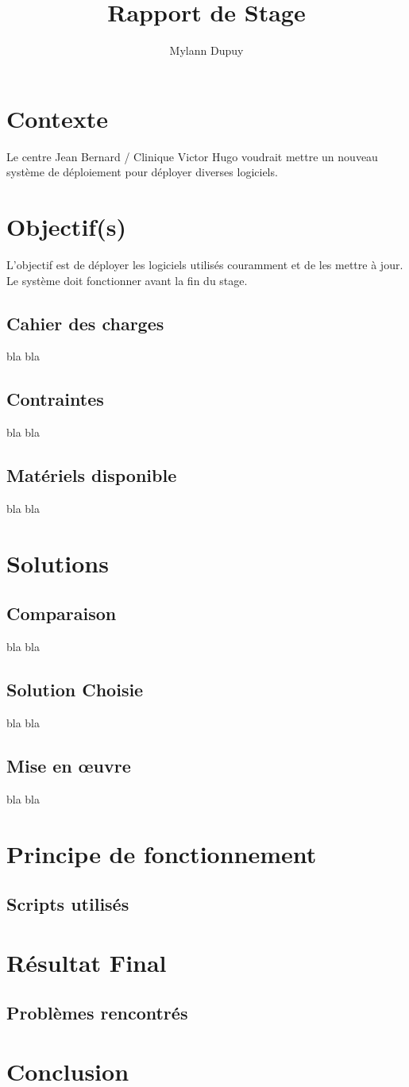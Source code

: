 \documentclass[11pt,a4paper,oneside]{article}
\author{Mylann Dupuy}
\title{Rapport de Stage}
\begin{document}
\maketitle
\newpage
\tableofcontents
\newpage
\section{Contexte}
Le centre Jean Bernard / Clinique Victor Hugo voudrait mettre un nouveau système de déploiement pour déployer diverses logiciels.
\section{Objectif(s)}
L'objectif est de déployer les logiciels utilisés couramment et de les mettre à jour. Le système doit fonctionner avant la fin du stage. 
\subsection{Cahier des charges}
bla bla
\\
\subsection{Contraintes}
bla bla
\\
\subsection{Matériels disponible}
bla bla
\\
\section{Solutions}
\subsection{Comparaison}
bla bla
\\
\subsection{Solution Choisie}
bla bla
\\
\subsection{Mise en \oe{}uvre}
bla bla
\\
\section{Principe de fonctionnement}
\subsection{Scripts utilisés}
\section{Résultat Final}
\subsection{Problèmes rencontrés}
\section{Conclusion}
\end{document}
